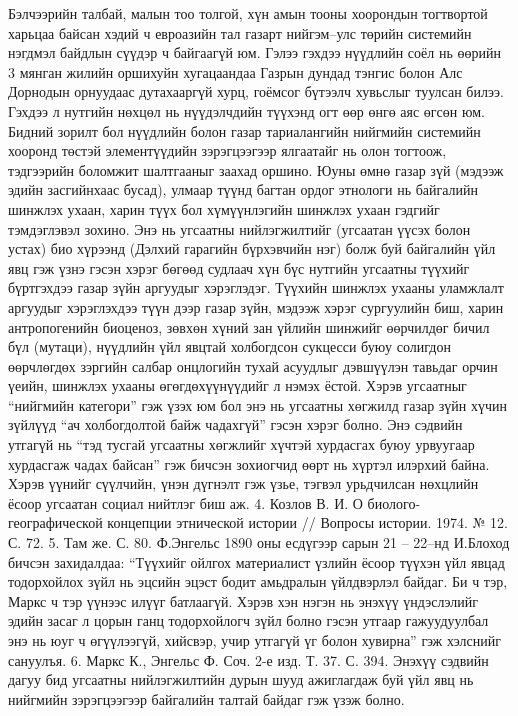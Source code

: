 Бэлчээрийн талбай, малын тоо толгой, хүн амын тооны хоорондын тогтвортой харьцаа байсан хэдий ч евроазийн тал газарт нийгэм–улс төрийн системийн нэгдмэл байдлын сүүдэр ч байгаагүй юм. Гэлээ гэхдээ нүүдлийн соёл нь өөрийн 3 мянган жилийн оршихуйн хугацаандаа Газрын дундад тэнгис болон Алс Дорнодын орнуудаас дутахааргүй хурц, гоёмсог бүтээлч хувьслыг туулсан билээ. Гэхдээ л нутгийн нөхцөл нь нүүдэлчдийн түүхэнд огт өөр өнгө аяс өгсөн юм. Бидний зорилт бол нүүдлийн болон газар тариалангийн нийгмийн системийн хооронд төстэй элементүүдийн зэрэгцээгээр ялгаатайг нь олон тогтоож, тэдгээрийн боломжит шалтгааныг заахад оршино.
Юуны өмнө газар зүй (мэдээж эдийн засгийнхаас бусад), улмаар түүнд багтан ордог этнологи нь байгалийн шинжлэх ухаан, харин түүх бол хүмүүнлэгийн шинжлэх ухаан гэдгийг тэмдэглэвэл зохино. Энэ нь угсаатны нийлэгжилтийг (угсаатан үүсэх болон устах) био хүрээнд (Дэлхий гарагийн бүрхэвчийн нэг) болж буй байгалийн үйл явц гэж үзнэ гэсэн хэрэг бөгөөд судлаач хүн бүс нутгийн угсаатны түүхийг бүртгэхдээ газар зүйн аргуудыг хэрэглэдэг. Түүхийн шинжлэх ухааны уламжлалт аргуудыг хэрэглэхдээ түүн дээр газар зүйн, мэдээж хэрэг сургуулийн биш, харин антропогенийн биоценоз, зөвхөн хүний зан үйлийн шинжийг өөрчилдөг бичил бүл (мутаци), нүүдлийн үйл явцтай холбогдсон сукцесси буюу солигдон өөрчлөгдөх зэргийн салбар онцлогийн тухай асуудлыг дэвшүүлэн тавьдаг орчин үеийн, шинжлэх ухааны өгөгдөхүүнүүдийг л нэмэх ёстой. Хэрэв угсаатныг “нийгмийн категори” гэж үзэх юм бол энэ нь угсаатны хөгжилд газар зүйн хүчин зүйлүүд “ач холбогдолтой байж чадахгүй” гэсэн хэрэг болно. Энэ сэдвийн утгагүй нь “тэд тусгай угсаатны хөгжлийг хүчтэй хурдасгах буюу урвуугаар хурдасгаж чадах байсан” гэж бичсэн зохиогчид өөрт нь хүртэл илэрхий байна. Хэрэв үүнийг сүүлчийн, үнэн дүгнэлт гэж үзье, тэгвэл урьдчилсан нөхцлийн ёсоор угсаатан социал нийтлэг биш аж. 4. Козлов В. И. О биолого-географической концепции этнической истории // Вопросы истории. 1974. № 12. С. 72. 5. Там же. С. 80.
Ф.Энгельс 1890 оны есдүгээр сарын 21 – 22–нд И.Блоход бичсэн захидалдаа: “Түүхийг ойлгох материалист үзлийн ёсоор түүхэн үйл явцад тодорхойлох зүйл нь эцсийн эцэст бодит амьдралын үйлдвэрлэл байдаг. Би ч тэр, Маркс ч тэр үүнээс илүүг батлаагүй. Хэрэв хэн нэгэн нь энэхүү үндэслэлийг эдийн засаг л цорын ганц тодорхойлогч зүйл болно гэсэн утгаар гажуудуулбал энэ нь юуг ч өгүүлээгүй, хийсвэр, учир утгагүй үг болон хувирна” гэж хэлснийг сануулъя. 6. Маркс К., Энгельс Ф. Соч. 2-е изд. Т. 37. С. 394.
Энэхүү сэдвийн дагуу бид угсаатны нийлэгжилтийн дурын шууд ажиглагдаж буй үйл явц нь нийгмийн зэрэгцээгээр байгалийн талтай байдаг гэж үзэж болно.
